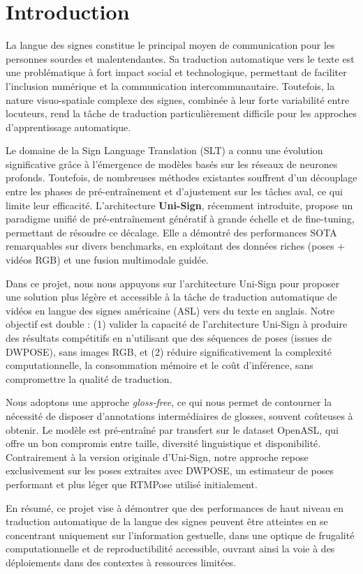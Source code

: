 \section*{Introduction}

La langue des signes constitue le principal moyen de communication pour les personnes sourdes et malentendantes. 
Sa traduction automatique vers le texte est une problématique à fort impact social et technologique, permettant de faciliter 
l’inclusion numérique et la communication intercommunautaire. Toutefois, la nature visuo-spatiale complexe des signes, combinée à leur forte 
variabilité entre locuteurs, rend la tâche de traduction particulièrement difficile pour les approches d’apprentissage automatique.

Le domaine de la Sign Language Translation (SLT) a connu une évolution significative grâce à l’émergence de modèles basés sur les réseaux de neurones 
profonds. Toutefois, de nombreuses méthodes existantes souffrent d’un découplage entre les phases de pré-entraînement et d’ajustement 
sur les tâches aval, ce qui limite leur efficacité. L’architecture \textbf{Uni-Sign}, récemment introduite, propose un paradigme unifié 
de pré-entraînement génératif à grande échelle et de fine-tuning, permettant de résoudre ce décalage. 
Elle a démontré des performances SOTA remarquables sur divers benchmarks, en exploitant des données riches (poses + vidéos RGB) et 
une fusion multimodale guidée.

Dans ce projet, nous nous appuyons sur l’architecture Uni-Sign pour proposer une solution plus légère et accessible à 
la tâche de traduction automatique de vidéos en langue des signes américaine (ASL) vers du texte en anglais. 
Notre objectif est double : (1) valider la capacité de l’architecture Uni-Sign à produire des résultats compétitifs en n’utilisant que 
des séquences de poses (issues de DWPOSE), sans images RGB, et (2) réduire significativement la complexité computationnelle, 
la consommation mémoire et le coût d’inférence, sans compromettre la qualité de traduction.

Nous adoptons une approche \textit{gloss-free}, ce qui nous permet de contourner la nécessité de disposer d’annotations intermédiaires de glosses, 
souvent coûteuses à obtenir. Le modèle est pré-entraîné par transfert sur le dataset OpenASL, qui offre un bon compromis entre taille, 
diversité linguistique et disponibilité. Contrairement à la version originale d’Uni-Sign, 
notre approche repose exclusivement sur les poses extraites avec DWPOSE, un estimateur de poses performant et plus léger que 
RTMPose utilisé initialement.

En résumé, ce projet vise à démontrer que des performances de haut niveau en traduction automatique de la langue des signes 
peuvent être atteintes en se concentrant uniquement sur l’information gestuelle, dans une optique de frugalité computationnelle 
et de reproductibilité accessible, ouvrant ainsi la voie à des déploiements dans des contextes à ressources limitées.
